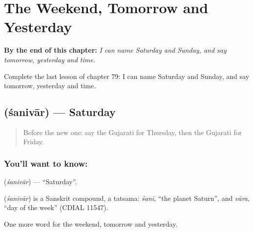 
\chapter{The Weekend, Tomorrow and Yesterday}
\label{ch:gu-the-weekend-tomorrow-and-yesterday}

\begin{chapteropening}
\textbf{By the end of this chapter:} \emph{I can name Saturday and Sunday, and say tomorrow, yesterday and time.}

Complete the last lesson of chapter 79: I can name Saturday and Sunday, and say tomorrow, yesterday and time.
\end{chapteropening}

\section[\texorpdfstring{\gu{શનિવાર} (śanivār)}{શનિવાર (śanivār)}]{ (śanivār) — Saturday}

\label{lesson:GU-C79-saturday}



\begin{quote}
Before the new one: say the Gujarati for Thursday, then the Gujarati for Friday.
\end{quote}

\subsection*{You'll want to know: }
\textbf{} (\emph{śanivār}) — \textquotedblleft{}Saturday\textquotedblright{}.

\begin{cousinweb}
\textbf{} (\emph{śanivār}) is a Sanskrit compound, a tatsama: \emph{śani}, \textquotedblleft{}the planet Saturn\textquotedblright{}, and \emph{vāra}, \textquotedblleft{}day of the week\textquotedblright{} (CDIAL 11547).
\end{cousinweb}

\begin{grammarlens}[title={What you've built}]
One more word for the weekend, tomorrow and yesterday.
\end{grammarlens}

